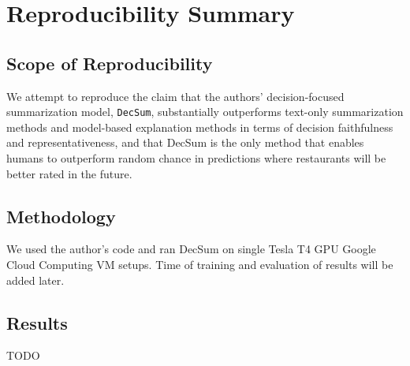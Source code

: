 \documentclass{article}
\title{}
\author{%
  Mingcheng Wang, Eric Xia, Trevor Jung\\ %
  University of Washington \\
 \texttt{\{wmingch, ericxia, tjung2\}@uw.edu} \\ %
}
\begin{document}
\maketitle




\section*{\centering Reproducibility Summary}

\subsection*{Scope of Reproducibility}
We attempt to reproduce the claim that the authors’ decision-focused summarization model, \texttt{DecSum}, substantially outperforms text-only summarization methods and model-based
explanation methods in terms of decision faithfulness and representativeness, and that DecSum is the only method that enables humans to outperform random chance in predictions where
restaurants will be better rated in the future.

\subsection*{Methodology}
We used the author’s code and ran DecSum on single Tesla T4 GPU Google Cloud Computing VM setups. Time of training and evaluation of results will be added later.

\subsection*{Results}
TODO
\end{document}
